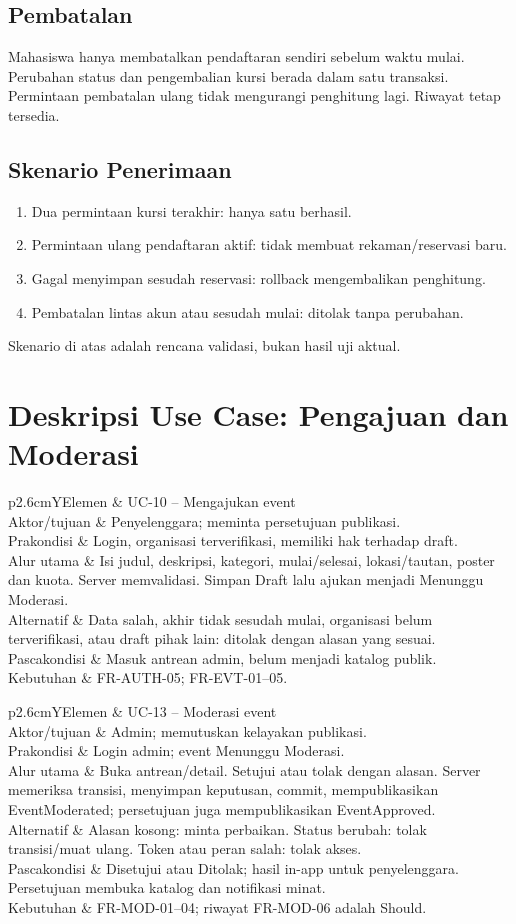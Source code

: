 \documentclass[11pt,a4paper]{article}
\newcommand{\tbl}[2]{\par\smallskip\noindent\begin{tabularx}{\linewidth}{#1}\toprule #2\bottomrule\end{tabularx}\par\smallskip}
\newcommand{\page}[1]{\clearpage\section{#1}}
\begin{document}
\subsection{Pembatalan}
Mahasiswa hanya membatalkan pendaftaran sendiri sebelum waktu mulai. Perubahan status dan pengembalian kursi berada dalam satu transaksi. Permintaan pembatalan ulang tidak mengurangi penghitung lagi. Riwayat tetap tersedia.
\subsection{Skenario Penerimaan}
\begin{enumerate}
\item Dua permintaan kursi terakhir: hanya satu berhasil.
\item Permintaan ulang pendaftaran aktif: tidak membuat rekaman/reservasi baru.
\item Gagal menyimpan sesudah reservasi: rollback mengembalikan penghitung.
\item Pembatalan lintas akun atau sesudah mulai: ditolak tanpa perubahan.
\end{enumerate}
Skenario di atas adalah rencana validasi, bukan hasil uji aktual.
\page{Deskripsi Use Case: Pengajuan dan Moderasi}
\tbl{p{2.6cm}Y}{Elemen & UC-10 -- Mengajukan event\\\midrule
Aktor/tujuan & Penyelenggara; meminta persetujuan publikasi.\\
Prakondisi & Login, organisasi terverifikasi, memiliki hak terhadap draft.\\
Alur utama & Isi judul, deskripsi, kategori, mulai/selesai, lokasi/tautan, poster dan kuota. Server memvalidasi. Simpan Draft lalu ajukan menjadi Menunggu Moderasi.\\
Alternatif & Data salah, akhir tidak sesudah mulai, organisasi belum terverifikasi, atau draft pihak lain: ditolak dengan alasan yang sesuai.\\
Pascakondisi & Masuk antrean admin, belum menjadi katalog publik.\\
Kebutuhan & FR-AUTH-05; FR-EVT-01--05.\\}
\vspace{.4cm}
\tbl{p{2.6cm}Y}{Elemen & UC-13 -- Moderasi event\\\midrule
Aktor/tujuan & Admin; memutuskan kelayakan publikasi.\\
Prakondisi & Login admin; event Menunggu Moderasi.\\
Alur utama & Buka antrean/detail. Setujui atau tolak dengan alasan. Server memeriksa transisi, menyimpan keputusan, commit, mempublikasikan EventModerated; persetujuan juga mempublikasikan EventApproved.\\
Alternatif & Alasan kosong: minta perbaikan. Status berubah: tolak transisi/muat ulang. Token atau peran salah: tolak akses.\\
Pascakondisi & Disetujui atau Ditolak; hasil in-app untuk penyelenggara. Persetujuan membuka katalog dan notifikasi minat.\\
Kebutuhan & FR-MOD-01--04; riwayat FR-MOD-06 adalah Should.\\}
\end{document}
